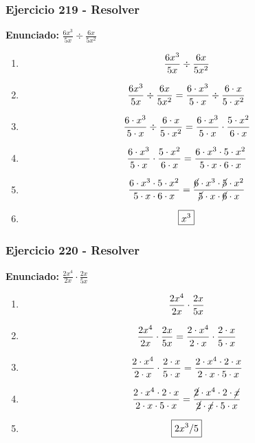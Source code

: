 \documentclass[11pt,a4paper]{article}
\newcommand{\fitmath}[1]{%
\[
\setbox0=\hbox{$\displaystyle #1$}%
\ifdim\wd0>\linewidth
\resizebox{\linewidth}{!}{$\displaystyle #1$}%
\else
#1%
\fi
\]
}
\begin{document}
\vspace{0.12cm}
\subsubsection*{Ejercicio 219 - Resolver}
\textbf{Enunciado:} $ \frac{6 x^{3}}{5 x} \div \frac{6 x}{5 x^{2}} $\par
\begin{enumerate}[leftmargin=2em]
\item \fitmath{\frac{6 x^{3}}{5 x} \div \frac{6 x}{5 x^{2}}}
\item \fitmath{\frac{6 x^{3}}{5 x} \div \frac{6 x}{5 x^{2}}= \frac{6\cdot x^{3}}{5\cdot x} \div \frac{6\cdot x}{5\cdot x^{2}}}
\item \fitmath{\frac{6\cdot x^{3}}{5\cdot x}\div \frac{6\cdot x}{5\cdot x^{2}}= \frac{6\cdot x^{3}}{5\cdot x}\cdot \frac{5\cdot x^{2}}{6\cdot x}}
\item \fitmath{\frac{6\cdot x^{3}}{5\cdot x}\cdot \frac{5\cdot x^{2}}{6\cdot x}= \frac{6\cdot x^{3}\cdot 5\cdot x^{2}}{5\cdot x\cdot 6\cdot x}}
\item \fitmath{\frac{6\cdot x^{3}\cdot 5\cdot x^{2}}{5\cdot x\cdot 6\cdot x}= \frac{\cancel{6}\cdot x^{3}\cdot \cancel{5}\cdot x^{2}}{\cancel{5}\cdot x\cdot \cancel{6}\cdot x}}
\item \fitmath{\boxed{x^{3}}}
\end{enumerate}

\vspace{0.12cm}
\subsubsection*{Ejercicio 220 - Resolver}
\textbf{Enunciado:} $ \frac{2 x^{4}}{2 x} \cdot \frac{2 x}{5 x} $\par
\begin{enumerate}[leftmargin=2em]
\item \fitmath{\frac{2 x^{4}}{2 x} \cdot \frac{2 x}{5 x}}
\item \fitmath{\frac{2 x^{4}}{2 x} \cdot \frac{2 x}{5 x}= \frac{2\cdot x^{4}}{2\cdot x} \cdot \frac{2\cdot x}{5\cdot x}}
\item \fitmath{\frac{2\cdot x^{4}}{2\cdot x}\cdot \frac{2\cdot x}{5\cdot x}= \frac{2\cdot x^{4}\cdot 2\cdot x}{2\cdot x\cdot 5\cdot x}}
\item \fitmath{\frac{2\cdot x^{4}\cdot 2\cdot x}{2\cdot x\cdot 5\cdot x}= \frac{\cancel{2}\cdot x^{4}\cdot 2\cdot \cancel{x}}{\cancel{2}\cdot \cancel{x}\cdot 5\cdot x}}
\item \fitmath{\boxed{2 x^{3} / 5}}
\end{enumerate}
\end{document}
